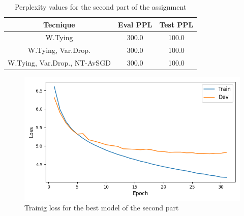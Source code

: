 \documentclass[a4paper]{article}
\begin{document}
\begin{table}[h]
  \centering
  \begin{tabular}{|c|c|c|}
    \hline
    \textbf{Tecnique} & \textbf{Eval PPL} & \textbf{Test PPL} \\
    \hline
    W.Tying & 300.0 & 100.0 \\
    W.Tying, Var.Drop. & 300.0 & 100.0 \\
    W.Tying, Var.Drop., NT-AvSGD & 300.0 & 100.0 \\
    \hline
  \end{tabular}
  \caption{Perplexity values for the second part of the assignment}
  \label{tab:results2}

\end{table}

\begin{figure}[h]
  \includegraphics[width=\linewidth]{./images/plot_2_loss.png}
  \caption{Trainig loss for the best model of the second part}
  \label{fig:fig2}
\end{figure}





\end{document}
